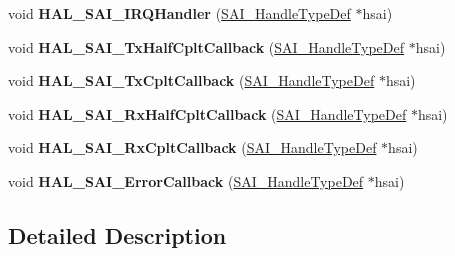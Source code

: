 \begin{DoxyCompactItemize}
\item 
void {\bfseries H\+A\+L\+\_\+\+S\+A\+I\+\_\+\+I\+R\+Q\+Handler} (\hyperlink{group___s_a_i___exported___types_gaf45214e5c90f73800130b3945bf45144}{S\+A\+I\+\_\+\+Handle\+Type\+Def} $\ast$hsai)\hypertarget{group___s_a_i___exported___functions___group2_ga7e890df5e5b04674f316fb3d9dd641b5}{}\label{group___s_a_i___exported___functions___group2_ga7e890df5e5b04674f316fb3d9dd641b5}

\item 
void {\bfseries H\+A\+L\+\_\+\+S\+A\+I\+\_\+\+Tx\+Half\+Cplt\+Callback} (\hyperlink{group___s_a_i___exported___types_gaf45214e5c90f73800130b3945bf45144}{S\+A\+I\+\_\+\+Handle\+Type\+Def} $\ast$hsai)\hypertarget{group___s_a_i___exported___functions___group2_gadb923532664ab9addc9036fbe39c7d32}{}\label{group___s_a_i___exported___functions___group2_gadb923532664ab9addc9036fbe39c7d32}

\item 
void {\bfseries H\+A\+L\+\_\+\+S\+A\+I\+\_\+\+Tx\+Cplt\+Callback} (\hyperlink{group___s_a_i___exported___types_gaf45214e5c90f73800130b3945bf45144}{S\+A\+I\+\_\+\+Handle\+Type\+Def} $\ast$hsai)\hypertarget{group___s_a_i___exported___functions___group2_ga1f0a735fa94285567877a27194e6a8d5}{}\label{group___s_a_i___exported___functions___group2_ga1f0a735fa94285567877a27194e6a8d5}

\item 
void {\bfseries H\+A\+L\+\_\+\+S\+A\+I\+\_\+\+Rx\+Half\+Cplt\+Callback} (\hyperlink{group___s_a_i___exported___types_gaf45214e5c90f73800130b3945bf45144}{S\+A\+I\+\_\+\+Handle\+Type\+Def} $\ast$hsai)\hypertarget{group___s_a_i___exported___functions___group2_gac3e769eacc58946595a7ecc1b69ae0eb}{}\label{group___s_a_i___exported___functions___group2_gac3e769eacc58946595a7ecc1b69ae0eb}

\item 
void {\bfseries H\+A\+L\+\_\+\+S\+A\+I\+\_\+\+Rx\+Cplt\+Callback} (\hyperlink{group___s_a_i___exported___types_gaf45214e5c90f73800130b3945bf45144}{S\+A\+I\+\_\+\+Handle\+Type\+Def} $\ast$hsai)\hypertarget{group___s_a_i___exported___functions___group2_gae465346926adb160d40f7b961e9aa711}{}\label{group___s_a_i___exported___functions___group2_gae465346926adb160d40f7b961e9aa711}

\item 
void {\bfseries H\+A\+L\+\_\+\+S\+A\+I\+\_\+\+Error\+Callback} (\hyperlink{group___s_a_i___exported___types_gaf45214e5c90f73800130b3945bf45144}{S\+A\+I\+\_\+\+Handle\+Type\+Def} $\ast$hsai)\hypertarget{group___s_a_i___exported___functions___group2_gad1069484ac8b4472e7f867e25b4ac805}{}\label{group___s_a_i___exported___functions___group2_gad1069484ac8b4472e7f867e25b4ac805}

\end{DoxyCompactItemize}


\subsection{Detailed Description}
